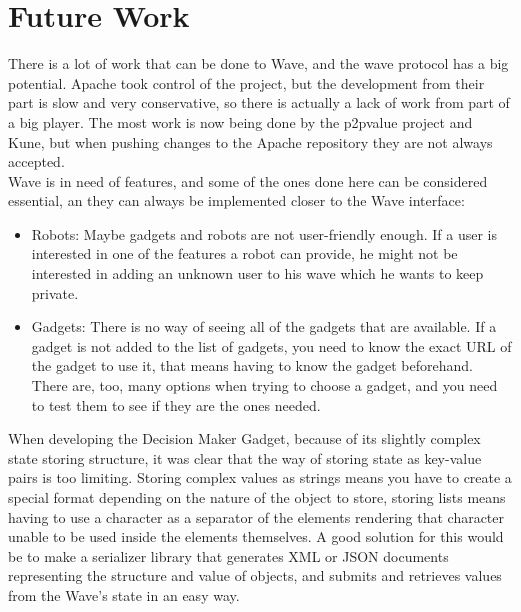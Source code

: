 \newpage
\section{Future Work}

There is a lot of work that can be done to Wave, and the wave protocol has a big potential. Apache took control of the project, but the development from their part is slow and very conservative, so there is actually a lack of work from part of a big player. The most work is now being done by the p2pvalue project and Kune, but when pushing changes to the Apache repository they are not always accepted.\\[.2cm]
Wave is in need of features, and some of the ones done here can be considered essential, an they can always be implemented closer to the Wave interface:
\begin{itemize}
  \item Robots: Maybe gadgets and robots are not user-friendly enough. If a user is interested in one of the features a robot can provide, he might not be interested in adding an unknown user to his wave which he wants to keep private.
  \item Gadgets: There is no way of seeing all of the gadgets that are available. If a gadget is not added to the list of gadgets, you need to know the exact URL of the gadget to use it, that means having to know the gadget beforehand. There are, too, many options when trying to choose a gadget, and you need to test them to see if they are the ones needed.
\end{itemize}
When developing the Decision Maker Gadget, because of its slightly complex state storing structure, it was clear that the way of storing state as key-value pairs is too limiting. Storing complex values as strings means you have to create a special format depending on the nature of the object to store, storing lists means having to use a character as a separator of the elements rendering that character unable to be used inside the elements themselves. A good solution for this would be to make a serializer library that generates XML or JSON documents representing the structure and value of objects, and submits and retrieves values from the  Wave's state in an easy way.


